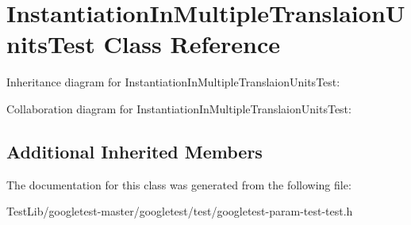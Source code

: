 \hypertarget{classInstantiationInMultipleTranslaionUnitsTest}{}\section{Instantiation\+In\+Multiple\+Translaion\+Units\+Test Class Reference}
\label{classInstantiationInMultipleTranslaionUnitsTest}


Inheritance diagram for Instantiation\+In\+Multiple\+Translaion\+Units\+Test\+:


Collaboration diagram for Instantiation\+In\+Multiple\+Translaion\+Units\+Test\+:
\subsection*{Additional Inherited Members}


The documentation for this class was generated from the following file\+:\begin{DoxyCompactItemize}
\item 
Test\+Lib/googletest-\/master/googletest/test/googletest-\/param-\/test-\/test.\+h\end{DoxyCompactItemize}
